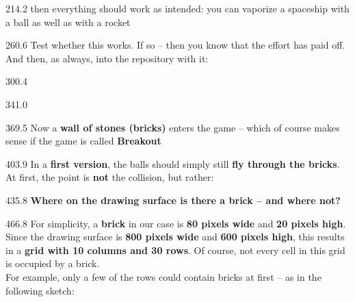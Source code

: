 \documentclass{aslab}
\begin{document}
\begin{region}[x=74.7,right=0,pitch=17.5]{214.2}
then everything should work as intended: you can vaporize a spaceship with a
ball as well as with a rocket 
\end{region}

\begin{region}[x=74.7,right=0,pitch=13.2]{260.6}
Test whether this works. If so -- then you know that the effort has paid off.
And then, as always, into the repository with it:
\end{region}

\begin{region}[x=74.7,right=0,pitch=13.5]{300.4}
\\
\end{region}

\begin{region}{341.0}
\end{region}

\begin{region}[pitch=17.7]{369.5}
Now a \textbf{wall of stones (bricks)} enters the game -- which of course
makes sense if the game is called \textbf{Breakout} 
\end{region}

\begin{region}[pitch=14.3]{403.9}
In a \textbf{first version}, the balls should simply still \textbf{fly
through the bricks}. At first, the point is \textbf{not} the collision, but
rather:
\end{region}

\begin{region}{435.8}
 \textbf{Where on the drawing surface is there a brick -- and
where not?}
\end{region}

\begin{region}[pitch=14.03]{466.8}
For simplicity, a \textbf{brick} in our case is \textbf{80 pixels wide} and
\textbf{20 pixels high}. Since the drawing surface is \textbf{800 pixels
wide} and \textbf{600 pixels high}, this results in a \textbf{grid with 10
columns and 30 rows}. Of course, not every cell in this grid is occupied by a
brick.\\
For example, only a few of the rows could contain bricks at first -- as in
the following sketch:
\end{region}

\end{document}
